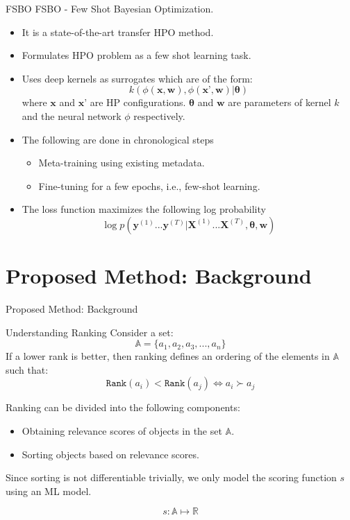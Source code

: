 \documentclass{beamer}
\begin{document}
\begin{frame}[t]{FSBO}
FSBO - Few Shot Bayesian Optimization.
\begin{itemize}
\item It is a state-of-the-art transfer HPO method.
\item Formulates HPO problem as a few shot learning task.
\item Uses deep kernels as surrogates which are of the form:
$$
k(\phi(\textbf{x}, \textbf{w})  ,   \phi(\textbf{x'}, \textbf{w}) |  \mathbf{\theta})
$$
where $\textbf{x}$ and $\textbf{x'}$ are HP configurations. $\mathbf{\theta}$ and $\textbf{w}$ are parameters of kernel $k$ and the neural network $\phi$ respectively.

\item The following are done in chronological steps
\begin{itemize}
\item Meta-training using existing metadata.
\item Fine-tuning for a few epochs, i.e., few-shot learning.
\end{itemize}
\item The loss function maximizes the following log probability
$$
\log p( \textbf{y}^{(1)}...\textbf{y}^{(T)} | \textbf{X}^{(1)}...\textbf{X}^{(T)}, \mathbf{\theta}, \textbf{w})
$$

\end{itemize}

\end{frame}

\section{Proposed Method: Background}

\begin{frame}

\centering
\LARGE{Proposed Method: Background}

\end{frame}

\begin{frame}[t]{Understanding Ranking}
Consider a set:
$$
\mathbb{A} = \{a_1,  a_2,  a_3, ... ,  a_n\}
$$
If a lower rank is better, then ranking defines an ordering of the elements in $\mathbb{A}$ such that:
$$
\texttt{Rank}(a_i) < \texttt{Rank}(a_j) \iff a_i  \succ a_j
$$

Ranking can be divided into the following components:
\begin{itemize}
\item Obtaining relevance scores of objects in the set $\mathbb{A}$.
\item Sorting objects based on relevance scores.
\end{itemize}

Since sorting is not differentiable trivially,  we only model the scoring function $s$ using an ML model.

$$
s : \mathbb{A} \mapsto \mathbb{R}
$$

\end{frame}
\end{document}
